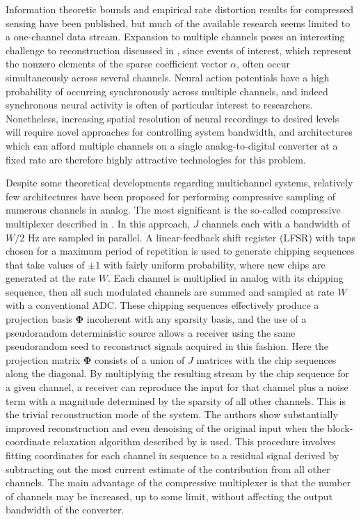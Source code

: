 \documentclass{paper}
\begin{document}
Information theoretic bounds \cite{aeron2010, sarvotham2006} and empirical 
rate distortion results for compressed sensing \cite{rambeloarison2012} have
been published, but much of the available research seems limited to a 
one-channel data stream. Expansion to multiple channels poses an interesting
challenge to reconstruction discussed in \cite{romberg2009}, since events of
interest, which represent the nonzero elements of the sparse coefficient 
vector $\alpha$, often occur simultaneously across several channels. Neural
action potentials have a high probability of occurring synchronously across
multiple channels, and indeed synchronous neural activity is often of 
particular interest to researchers. Nonetheless, increasing spatial 
resolution of neural recordings to desired levels will require novel
approaches for controlling system bandwidth, and architectures which can
afford multiple channels on a single analog-to-digital converter at a fixed
rate are therefore highly attractive technologies for this problem.

Despite some theoretical developments regarding multichannel systems,
relatively few architectures have been proposed for performing compressive
sampling of numerous channels in analog. The most significant is the
so-called compressive multiplexer described in \cite{slavinsky2011}. In 
this approach, $J$ channels each with a bandwidth of $W/2$ Hz are sampled
in parallel. A linear-feedback shift register (LFSR) with taps chosen for
a maximum period of repetition is used to generate chipping sequences that 
take values of $\pm 1$ with fairly uniform probability, where new chips are
generated at the rate $W$. Each channel is multiplied in analog with its 
chipping sequence, then all such modulated channels are summed and sampled 
at rate $W$ with a conventional ADC. These chipping sequences effectively 
produce a projection basis $\mathbf{\Phi}$ incoherent with any sparsity 
basis, and the use of a pseudorandom deterministic source allows a receiver
using the same pseudorandom seed to reconstruct signals acquired in this 
fashion. Here the projection matrix $\mathbf{\Phi}$ consists of a union of
$J$ matrices with the chip sequences along the diagonal. By multiplying the 
resulting stream by the chip sequence for a 
given channel, a receiver can reproduce the input for that channel plus a
noise term with a magnitude determined by the sparsity of all other 
channels. This is the trivial reconstruction mode of the system. The 
authors show substantially improved reconstruction and even denoising of
the original input when the block-coordinate relaxation algorithm described 
by \cite{sylvain2000} is used. This procedure involves fitting coordinates 
for each channel in sequence to a residual signal derived by subtracting out
the most current estimate of the contribution from all other channels. The
main advantage of the compressive multiplexer is that the number of channels
may be increased, up to some limit, without affecting the output bandwidth 
of the converter.
\end{document}
